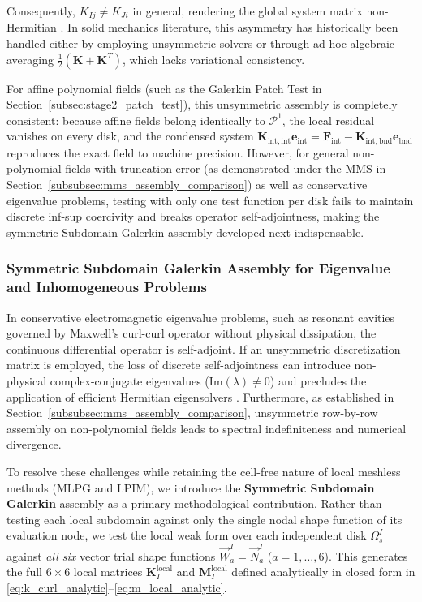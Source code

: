 \documentclass[VANCOUVER,Times1COL]{WileyNJD-v5}
\begin{document}
\begin{remark}
\begin{enumerate}
    \end{enumerate}
    Consequently, $K_{Ij} \ne K_{Ji}$ in general, rendering the global system matrix non-Hermitian \cite{atluri2002meshless, liu2001local}. In solid mechanics literature, this asymmetry has historically been handled either by employing unsymmetric solvers or through ad-hoc algebraic averaging $\frac{1}{2}(\mathbf{K} + \mathbf{K}^T)$, which lacks variational consistency.

    For affine polynomial fields (such as the Galerkin Patch Test in Section~\ref{subsec:stage2_patch_test}), this unsymmetric assembly is completely consistent: because affine fields belong identically to $\mathcal{P}^1$, the local residual vanishes on every disk, and the condensed system $\mathbf{K}_{\mathrm{int}, \mathrm{int}} \mathbf{e}_{\mathrm{int}} = \mathbf{F}_{\mathrm{int}} - \mathbf{K}_{\mathrm{int}, \mathrm{bnd}} \mathbf{e}_{\mathrm{bnd}}$ reproduces the exact field to machine precision. However, for general non-polynomial fields with truncation error (as demonstrated under the MMS in Section~\ref{subsubsec:mms_assembly_comparison}) as well as conservative eigenvalue problems, testing with only one test function per disk fails to maintain discrete inf-sup coercivity and breaks operator self-adjointness, making the symmetric Subdomain Galerkin assembly developed next indispensable.
\end{remark}

\subsubsection{Symmetric Subdomain Galerkin Assembly for Eigenvalue and Inhomogeneous Problems}
\label{subsubsec:symmetric_assembly}

In conservative electromagnetic eigenvalue problems, such as resonant cavities governed by Maxwell's curl-curl operator without physical dissipation, the continuous differential operator is self-adjoint. If an unsymmetric discretization matrix is employed, the loss of discrete self-adjointness can introduce non-physical complex-conjugate eigenvalues ($\mathrm{Im}(\lambda) \ne 0$) and precludes the application of efficient Hermitian eigensolvers \cite{saad2011numerical, boffi2013mixed}. Furthermore, as established in Section~\ref{subsubsec:mms_assembly_comparison}, unsymmetric row-by-row assembly on non-polynomial fields leads to spectral indefiniteness and numerical divergence.

To resolve these challenges while retaining the cell-free nature of local meshless methods (MLPG and LPIM), we introduce the \textbf{Symmetric Subdomain Galerkin} assembly as a primary methodological contribution. Rather than testing each local subdomain against only the single nodal shape function of its evaluation node, we test the local weak form over each independent disk $\Omega_s^I$ against \textit{all six} vector trial shape functions $\vec{W}_a^I = \vec{N}_a^I$ ($a=1,\dots,6$). This generates the full $6 \times 6$ local matrices $\mathbf{K}_I^{\mathrm{local}}$ and $\mathbf{M}_I^{\mathrm{local}}$ defined analytically in closed form in \eqref{eq:k_curl_analytic}--\eqref{eq:m_local_analytic}.
\end{document}
